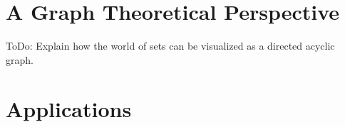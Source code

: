 \section{A Graph Theoretical Perspective}
ToDo: Explain how the world of sets can be visualized as a directed acyclic graph. 










\section{Applications}

